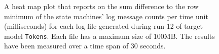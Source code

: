\begin{figure}[htbp]
\centering
\begin{minipage}{1\textwidth}
  \centering
\end{minipage}
\caption{A heat map plot that reports on the sum difference to the row minimum of the state machines' log message counts per time unit (milliseconds) for each log file generated during run 12 of target model \texttt{Tokens}. Each file has a maximum size of 100MB. The results have been measured over a time span of 30 seconds.}
\label{figure:throughput_difference_tokens_12}
\end{figure}
